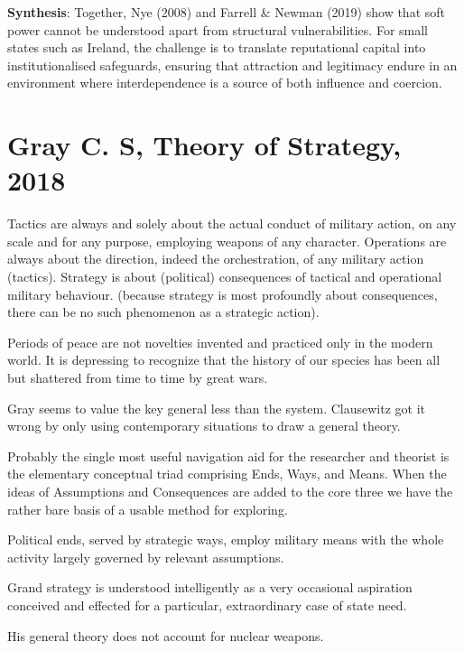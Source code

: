 \textbf{Synthesis}: Together, Nye (2008) and Farrell \& Newman (2019) show that soft power cannot be understood apart from structural vulnerabilities. For small states such as Ireland, the challenge is to translate reputational capital into institutionalised safeguards, ensuring that attraction and legitimacy endure in an environment where interdependence is a source of both influence and coercion.








\section*{Gray C. S, Theory of Strategy, 2018}

\parencite{GRAY_2018}Tactics are always and solely about the actual conduct of military action, on any scale and for any purpose, employing weapons of any character.  
Operations are always about the direction, indeed the orchestration, of any military action (tactics).  
Strategy is about (political) consequences of tactical and operational military behaviour. (because strategy is most profoundly about consequences, there can be no such phenomenon as a strategic action).  

Periods of peace are not novelties invented and practiced only in the modern world. It is depressing to recognize that the history of our species has been all but shattered from time to time by great wars.  

Gray seems to value the key general less than the system.  
Clausewitz got it wrong by only using contemporary situations to draw a general theory.  

Probably the single most useful navigation aid for the researcher and theorist is the elementary conceptual triad comprising Ends, Ways, and Means. When the ideas of Assumptions and Consequences are added to the core three we have the rather bare basis of a usable method for exploring.  

Political ends, served by strategic ways, employ military means with the whole activity largely governed by relevant assumptions.  

Grand strategy is understood intelligently as a very occasional aspiration conceived and effected for a particular, extraordinary case of state need.  

His general theory does not account for nuclear weapons.  

